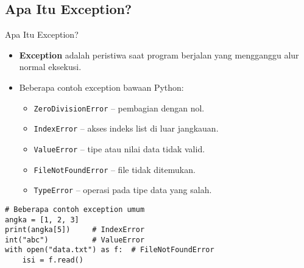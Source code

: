 \documentclass[aspectratio=169, table]{beamer}
\begin{document}
\subsection*{Apa Itu Exception?}
\begin{frame}[fragile]{Apa Itu Exception?}
\vspace*{20pt}
\begin{itemize}
  \item \textbf{Exception} adalah peristiwa saat program berjalan
  yang mengganggu alur normal eksekusi.
  \item Beberapa contoh exception bawaan Python:
  \begin{itemize}
    \item \texttt{ZeroDivisionError} – pembagian dengan nol.
    \item \texttt{IndexError} – akses indeks list di luar jangkauan.
    \item \texttt{ValueError} – tipe atau nilai data tidak valid.
    \item \texttt{FileNotFoundError} – file tidak ditemukan.
    \item \texttt{TypeError} – operasi pada tipe data yang salah.
  \end{itemize}
\end{itemize}

\begin{lstlisting}[style=PythonStyle]
# Beberapa contoh exception umum
angka = [1, 2, 3]
print(angka[5])     # IndexError
int("abc")          # ValueError
with open("data.txt") as f:  # FileNotFoundError
    isi = f.read()
\end{lstlisting}
\end{frame}
\end{document}
